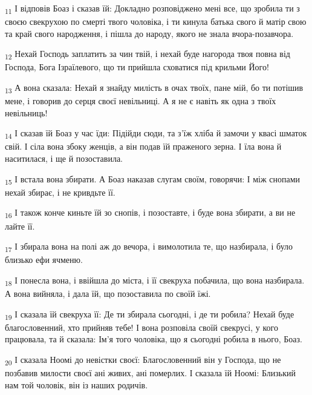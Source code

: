 \begin{tcolorbox}
\textsubscript{11} І відповів Боаз і сказав їй: Докладно розповіджено мені все, що зробила ти з своєю свекрухою по смерті твого чоловіка, і ти кинула батька свого й матір свою та край свого народження, і пішла до народу, якого не знала вчора-позавчора.
\end{tcolorbox}
\begin{tcolorbox}
\textsubscript{12} Нехай Господь заплатить за чин твій, і нехай буде нагорода твоя повна від Господа, Бога Ізраїлевого, що ти прийшла сховатися під крильми Його!
\end{tcolorbox}
\begin{tcolorbox}
\textsubscript{13} А вона сказала: Нехай я знайду милість в очах твоїх, пане мій, бо ти потішив мене, і говорив до серця своєї невільниці. А я не є навіть як одна з твоїх невільниць!
\end{tcolorbox}
\begin{tcolorbox}
\textsubscript{14} І сказав їй Боаз у час їди: Підійди сюди, та з'їж хліба й замочи у квасі шматок свій. І сіла вона збоку женців, а він подав їй праженого зерна. І їла вона й наситилася, і ще й позоставила.
\end{tcolorbox}
\begin{tcolorbox}
\textsubscript{15} І встала вона збирати. А Боаз наказав слугам своїм, говорячи: І між снопами нехай збирає, і не кривдьте її.
\end{tcolorbox}
\begin{tcolorbox}
\textsubscript{16} І також конче киньте їй зо снопів, і позоставте, і буде вона збирати, а ви не лайте її.
\end{tcolorbox}
\begin{tcolorbox}
\textsubscript{17} І збирала вона на полі аж до вечора, і вимолотила те, що назбирала, і було близько ефи ячменю.
\end{tcolorbox}
\begin{tcolorbox}
\textsubscript{18} І понесла вона, і ввійшла до міста, і її свекруха побачила, що вона назбирала. А вона вийняла, і дала їй, що позоставила по своїй їжі.
\end{tcolorbox}
\begin{tcolorbox}
\textsubscript{19} І сказала їй свекруха її: Де ти збирала сьогодні, і де ти робила? Нехай буде благословенний, хто прийняв тебе! І вона розповіла своїй свекрусі, у кого працювала, та й сказала: Ім'я того чоловіка, що я сьогодні робила в нього, Боаз.
\end{tcolorbox}
\begin{tcolorbox}
\textsubscript{20} І сказала Ноомі до невістки своєї: Благословенний він у Господа, що не позбавив милости своєї ані живих, ані померлих. І сказала їй Ноомі: Близький нам той чоловік, він із наших родичів.
\end{tcolorbox}
